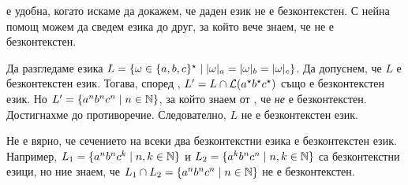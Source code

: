  е удобна, когато искаме да докажем, че даден език не е безконтекстен.
С нейна помощ можем да сведем езика до друг, за който вече знаем, че не е безконтекстен.

\begin{extra}
  \begin{example}
    Да разгледаме езика $L = \{\omega \in \{a,b,c\}^\star \mid \vert{\omega}\vert_{a} = \vert{\omega}\vert_{b} = \vert{\omega}\vert_{c}\}$.
    Да допуснем, че $L$ е безконтекстен език. Тогава, според , $L^\prime = L \cap \mathcal{L}(a^\star b^\star c^\star)$ също е безконтекстен език.
    Но $L^\prime = \{a^nb^nc^n \mid n \in \mathbb{N}\}$, за който знаем от , че {\em не} е безконтекстен.
    Достигнахме до противоречие. Следователно, $L$ не е безконтекстен език.
  \end{example}
\end{extra}

\begin{important}
  \begin{remark}
    Не е вярно, че сечението на всеки два безконтекстни езика е безконтекстен език.
    Например, $L_1 = \{a^nb^nc^k \mid n,k\in\mathbb{N}\}$ и $L_2 = \{a^kb^nc^n \mid n,k\in\mathbb{N}\}$
    са безконтекстни езици, но ние знаем, че $L_1 \cap L_2 = \{a^nb^nc^n \mid n \in \mathbb{N}\}$
    не е безконтекстен.
  \end{remark}
\end{important}


